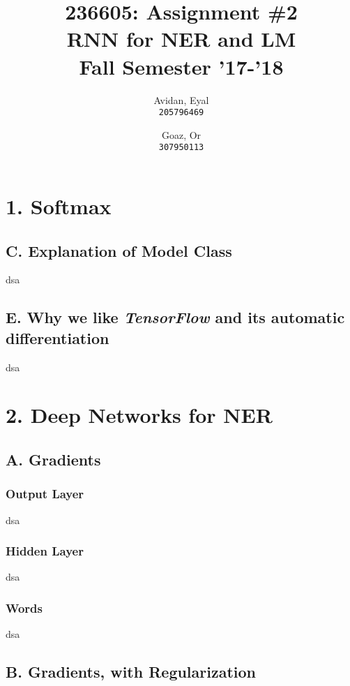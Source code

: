 \documentclass{article}
\begin{document}
\title{%
  236605: Assignment \#2 \\
  \large RNN for NER and LM \\
    Fall Semester '17-'18}

\author{
  Avidan, Eyal \\
  \texttt{205796469}
  \and
  Goaz, Or \\
  \texttt{307950113}
}

\maketitle

\section*{1. Softmax}
\subsection*{C. Explanation of Model Class}
dsa

\subsection*{E. Why we like \emph{TensorFlow} and its automatic differentiation}
dsa


\section*{2. Deep Networks for \textbf{NER}}
\subsection*{A. Gradients}
\subsubsection*{Output Layer}
dsa

\subsubsection*{Hidden Layer}
dsa

\subsubsection*{Words}
dsa


\subsection*{B. Gradients, with Regularization}
\end{document}
